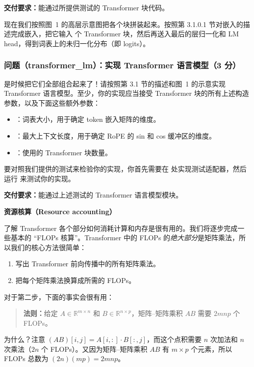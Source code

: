 \textbf{交付要求：}能通过所提供测试的 Transformer 块代码。

现在我们按照图~1 的高层示意图把各个块拼装起来。按照第 3.1.0.1 节对嵌入的描述完成嵌入，把它输入  个 Transformer 块，然后再送入最后的层归一化和 LM head，得到词表上的未归一化分布（即 logits）。

\subsubsection*{问题（transformer\_lm）：实现 Transformer 语言模型（3 分）}

是时候把它们全部组合起来了！请按照第 3.1 节的描述和图~1 的示意实现 Transformer 语言模型。至少，你的实现应当接受 Transformer 块的所有上述构造参数，以及下面这些额外参数：
\begin{itemize}
  \item {}：词表大小，用于确定 token 嵌入矩阵的维度。
  \item {}：最大上下文长度，用于确定 RoPE 的 sin 和 cos 缓冲区的维度。
  \item {}：使用的 Transformer 块数量。
\end{itemize}
要对照我们提供的测试来检验你的实现，你首先需要在  处实现测试适配器，然后运行  来测试你的实现。

\textbf{交付要求：}能通过上述测试的 Transformer 语言模型模块。

\textbf{资源核算（Resource accounting）}

了解 Transformer 各个部分如何消耗计算和内存是很有用的。我们将逐步完成一些基本的 ``FLOPs 核算''。Transformer 中的 FLOPs 的\textit{绝大部分}是矩阵乘法，所以我们的核心方法很简单：
\begin{enumerate}
  \item 写出 Transformer 前向传播中的所有矩阵乘法。
  \item 把每个矩阵乘法换算成所需的 FLOPs。
\end{enumerate}
对于第二步，下面的事实会很有用：

\begin{quote}
\textbf{法则：}给定 $A \in \mathbb{R}^{m \times n}$ 和 $B \in \mathbb{R}^{n \times p}$，矩阵--矩阵乘积 $AB$ 需要 $2mnp$ 个 FLOPs。
\end{quote}

为什么？注意 $(AB)[i, j] = A[i, :] \cdot B[:, j]$，而这个点积需要 $n$ 次加法和 $n$ 次乘法（$2n$ 个 FLOPs）。又因为矩阵--矩阵乘积 $AB$ 有 $m \times p$ 个元素，所以 FLOPs 总数为 $(2n)(mp) = 2mnp$。

